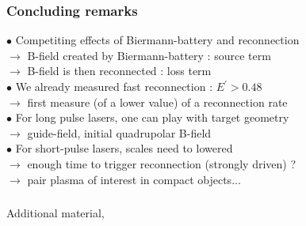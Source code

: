 \documentclass{beamer}
\begin{document}
\begin{frame}
\frametitle{Concluding remarks}

$\bullet$ Competiting effects of Biermann-battery and reconnection \\
$\to$ B-field created by Biermann-battery : source term \\
$\to$ B-field is then reconnected : loss term \\[0.6cm]

$\bullet$ We already measured fast reconnection : $E^{\prime} > 0.48$ \\
$\to$ first measure (of a lower value) of a reconnection rate \\[0.6cm]

$\bullet$ For long pulse lasers, one can play with target geometry \\
$\to$ guide-field, initial quadrupolar B-field \\[0.6cm]

$\bullet$ For short-pulse lasers, scales need to lowered \\
$\to$ enough time to trigger reconnection (strongly driven) ? \\
$\to$ pair plasma of interest in compact objects... \\

\end{frame}













\begin{frame}
\frametitle{}

{ {\LARGE Additional material,}}

\end{frame}
\end{document}
